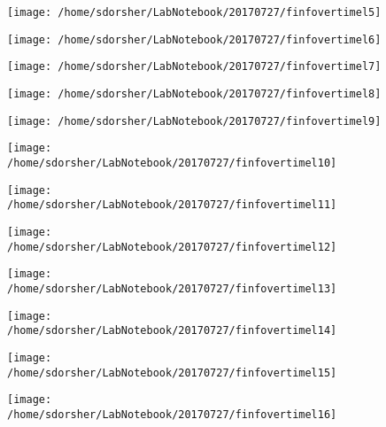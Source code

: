 \documentclass{article}
\begin{document}
\begin{figure}
  \texttt{[image: /home/sdorsher/LabNotebook/20170727/finfovertimel5]}
\end{figure}

\begin{figure}
  \texttt{[image: /home/sdorsher/LabNotebook/20170727/finfovertimel6]}
\end{figure}

\begin{figure}
  \texttt{[image: /home/sdorsher/LabNotebook/20170727/finfovertimel7]}
\end{figure}




\begin{figure}
  \texttt{[image: /home/sdorsher/LabNotebook/20170727/finfovertimel8]}
\end{figure}

\begin{figure}
  \texttt{[image: /home/sdorsher/LabNotebook/20170727/finfovertimel9]}
\end{figure}

\begin{figure}
  \texttt{[image: /home/sdorsher/LabNotebook/20170727/finfovertimel10]}
\end{figure}

\begin{figure}
  \texttt{[image: /home/sdorsher/LabNotebook/20170727/finfovertimel11]}
\end{figure}

\begin{figure}
  \texttt{[image: /home/sdorsher/LabNotebook/20170727/finfovertimel12]}
\end{figure}

\begin{figure}
  \texttt{[image: /home/sdorsher/LabNotebook/20170727/finfovertimel13]}
\end{figure}

\begin{figure}
  \texttt{[image: /home/sdorsher/LabNotebook/20170727/finfovertimel14]}
\end{figure}

\begin{figure}
  \texttt{[image: /home/sdorsher/LabNotebook/20170727/finfovertimel15]}
\end{figure}

\begin{figure}
  \texttt{[image: /home/sdorsher/LabNotebook/20170727/finfovertimel16]}
\end{figure}
\end{document}
